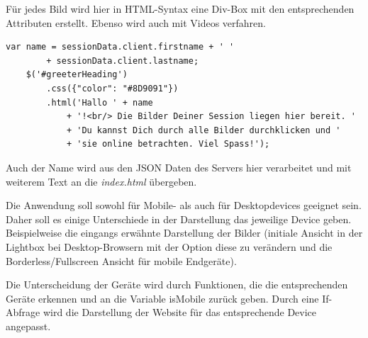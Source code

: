 Für jedes Bild wird hier in HTML-Syntax eine Div-Box mit den entsprechenden Attributen erstellt.
Ebenso wird auch mit Videos verfahren.

	\begin{lstlisting}[caption={Auszug aus app.js (Webclient)}, label=list_client]
	var name = sessionData.client.firstname + ' ' 
		+ sessionData.client.lastname;
	$('#greeterHeading')
		.css({"color": "#8D9091"})
		.html('Hallo ' + name 
			+ '!<br/> Die Bilder Deiner Session liegen hier bereit. ' 
			+ 'Du kannst Dich durch alle Bilder durchklicken und '
			+ 'sie online betrachten. Viel Spass!');
	\end{lstlisting}


Auch der Name wird aus den JSON Daten des Servers hier verarbeitet und mit weiterem Text an die \textit{index.html} übergeben. 

Die Anwendung soll sowohl für Mobile- als auch für Desktopdevices geeignet sein. Daher soll es einige Unterschiede in der Darstellung das jeweilige Device geben. Beispielweise die eingangs erwähnte Darstellung der Bilder (initiale Ansicht in der Lightbox bei Desktop-Browsern mit der Option diese zu verändern und die Borderless/Fullscreen Ansicht für mobile Endgeräte). 

Die Unterscheidung der Geräte wird durch Funktionen, die die entsprechenden Geräte erkennen und an die Variable isMobile zurück geben. Durch eine If-Abfrage wird die Darstellung der Website für das entsprechende Device angepasst.

